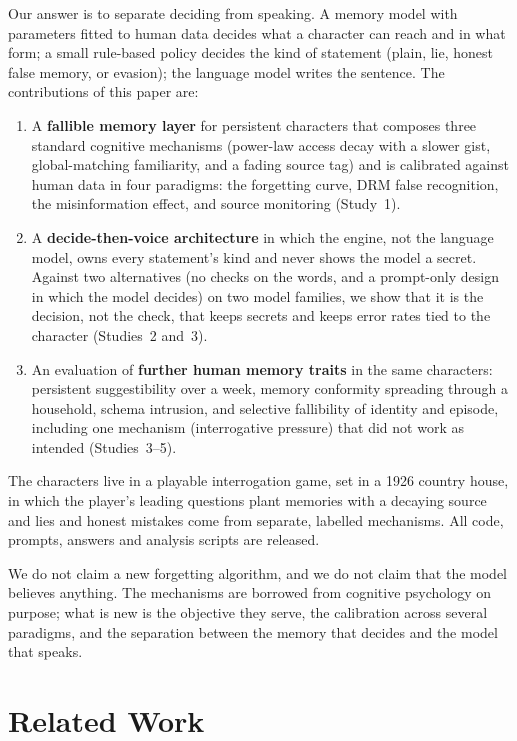 \documentclass[conference]{IEEEtran}
\begin{document}
Our answer is to separate deciding from speaking. A memory model with parameters fitted to human data
decides what a character can reach and in what form; a small rule-based policy decides the kind of
statement (plain, lie, honest false memory, or evasion); the language model writes the sentence. The
contributions of this paper are:

\begin{enumerate}
\item A \textbf{fallible memory layer} for persistent characters that composes three standard
cognitive mechanisms (power-law access decay with a slower gist, global-matching familiarity, and
a fading source tag) and is calibrated against human data in four paradigms: the forgetting curve,
DRM false recognition, the misinformation effect, and source monitoring (Study~1).
\item A \textbf{decide-then-voice architecture} in which the engine, not the language model, owns
every statement's kind and never shows the model a secret. Against two alternatives (no checks on the
words, and a prompt-only design in which the model decides) on two model families, we show that it is
the decision, not the check, that keeps secrets and keeps error rates tied to the character
(Studies~2 and~3).
\item An evaluation of \textbf{further human memory traits} in the same characters: persistent
suggestibility over a week, memory conformity spreading through a household, schema intrusion, and
selective fallibility of identity and episode, including one mechanism (interrogative pressure) that
did not work as intended (Studies~3--5).
\end{enumerate}

The characters live in a playable interrogation game, set in a 1926 country house, in which the
player's leading questions plant memories with a decaying source and lies and honest mistakes come
from separate, labelled mechanisms. All code, prompts, answers and analysis scripts are
released.

We do not claim a new forgetting algorithm, and we do not claim that the model believes anything.
The mechanisms are borrowed from cognitive psychology on purpose; what is new is the objective they
serve, the calibration across several paradigms, and the separation between the memory that decides
and the model that speaks.

\section{Related Work}
\end{document}

